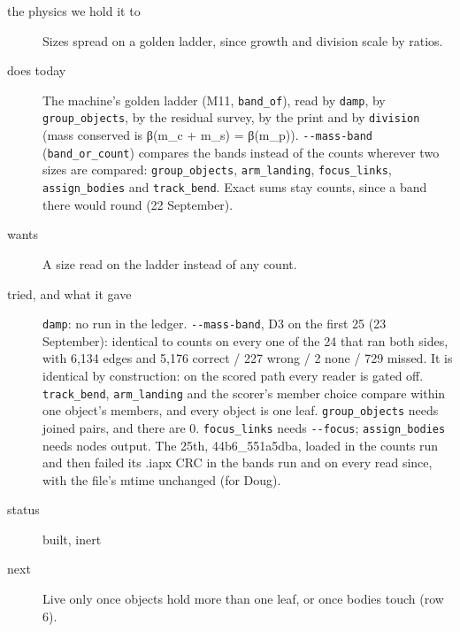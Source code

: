 \begin{description}
\item[{the physics we hold it to}] Sizes spread on a golden ladder, since growth and division scale by ratios.
\item[{does today}] The machine's golden ladder (M11, \texttt{band\_\allowbreak{}of}), read by \texttt{damp}, by \texttt{group\_\allowbreak{}objects}, by the residual survey, by the print and by \texttt{division} (mass conserved is β(m\_\allowbreak{}c + m\_\allowbreak{}s) = β(m\_\allowbreak{}p)). \texttt{-\allowbreak{}-\allowbreak{}mass-\allowbreak{}band} (\texttt{band\_\allowbreak{}or\_\allowbreak{}count}) compares the bands instead of the counts wherever two sizes are compared: \texttt{group\_\allowbreak{}objects}, \texttt{arm\_\allowbreak{}landing}, \texttt{focus\_\allowbreak{}links}, \texttt{assign\_\allowbreak{}bodies} and \texttt{track\_\allowbreak{}bend}. Exact sums stay counts, since a band there would round (22 September).
\item[{wants}] A size read on the ladder instead of any count.
\item[{tried, and what it gave}] \texttt{damp}: no run in the ledger. \texttt{-\allowbreak{}-\allowbreak{}mass-\allowbreak{}band}, D3 on the first 25 (23 September): identical to counts on every one of the 24 that ran both sides, with 6,134 edges and 5,176 correct / 227 wrong / 2 none / 729 missed. It is identical by construction: on the scored path every reader is gated off. \texttt{track\_\allowbreak{}bend}, \texttt{arm\_\allowbreak{}landing} and the scorer's member choice compare within one object's members, and every object is one leaf. \texttt{group\_\allowbreak{}objects} needs joined pairs, and there are 0. \texttt{focus\_\allowbreak{}links} needs \texttt{-\allowbreak{}-\allowbreak{}focus}; \texttt{assign\_\allowbreak{}bodies} needs nodes output. The 25th, 44b6\_\allowbreak{}551a5dba, loaded in the counts run and then failed its .iapx CRC in the bands run and on every read since, with the file's mtime unchanged (for Doug).
\item[{status}] built, inert
\item[{next}] Live only once objects hold more than one leaf, or once bodies touch (row 6).
\end{description}

